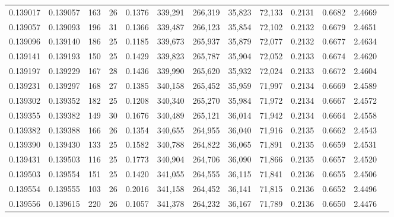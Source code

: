 \begin{tabular}{rrrrrrrrrrrrr}
0.139017 & 0.139057 & 163 &  26 &                                     0.1376 & 339,291 & 266,319 &  35,823 &  72,133 & 0.2131 & 0.6682 & 2.4669 \\
0.139057 & 0.139093 & 196 &  31 &                                     0.1366 & 339,487 & 266,123 &  35,854 &  72,102 & 0.2132 & 0.6679 & 2.4651 \\
0.139096 & 0.139140 & 186 &  25 &                                     0.1185 & 339,673 & 265,937 &  35,879 &  72,077 & 0.2132 & 0.6677 & 2.4634 \\
0.139141 & 0.139193 & 150 &  25 &                                     0.1429 & 339,823 & 265,787 &  35,904 &  72,052 & 0.2133 & 0.6674 & 2.4620 \\
0.139197 & 0.139229 & 167 &  28 &                                     0.1436 & 339,990 & 265,620 &  35,932 &  72,024 & 0.2133 & 0.6672 & 2.4604 \\
0.139231 & 0.139297 & 168 &  27 &                                     0.1385 & 340,158 & 265,452 &  35,959 &  71,997 & 0.2134 & 0.6669 & 2.4589 \\
0.139302 & 0.139352 & 182 &  25 &                                     0.1208 & 340,340 & 265,270 &  35,984 &  71,972 & 0.2134 & 0.6667 & 2.4572 \\
0.139355 & 0.139382 & 149 &  30 &                                     0.1676 & 340,489 & 265,121 &  36,014 &  71,942 & 0.2134 & 0.6664 & 2.4558 \\
0.139382 & 0.139388 & 166 &  26 &                                     0.1354 & 340,655 & 264,955 &  36,040 &  71,916 & 0.2135 & 0.6662 & 2.4543 \\
0.139390 & 0.139430 & 133 &  25 &                                     0.1582 & 340,788 & 264,822 &  36,065 &  71,891 & 0.2135 & 0.6659 & 2.4531 \\
0.139431 & 0.139503 & 116 &  25 &                                     0.1773 & 340,904 & 264,706 &  36,090 &  71,866 & 0.2135 & 0.6657 & 2.4520 \\
0.139503 & 0.139554 & 151 &  25 &                                     0.1420 & 341,055 & 264,555 &  36,115 &  71,841 & 0.2136 & 0.6655 & 2.4506 \\
0.139554 & 0.139555 & 103 &  26 &                                     0.2016 & 341,158 & 264,452 &  36,141 &  71,815 & 0.2136 & 0.6652 & 2.4496 \\
0.139556 & 0.139615 & 220 &  26 &                                     0.1057 & 341,378 & 264,232 &  36,167 &  71,789 & 0.2136 & 0.6650 & 2.4476 \\

\end{tabular}
